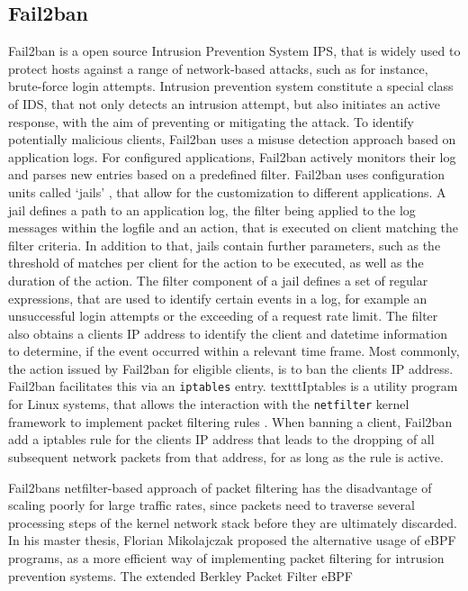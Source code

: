 \subsection{Fail2ban} \label{sec:fail2ban}

Fail2ban is a open source Intrusion Prevention System \ac{IPS}, that is widely used to protect hosts against a range of network-based attacks, such as for instance, brute-force login attempts\cite{fail2ban}. Intrusion prevention system constitute
a special class of \ac{IDS}, that not only detects an intrusion attempt, but also initiates an active response, with the aim of preventing or mitigating the attack. To identify potentially malicious clients,
Fail2ban uses a misuse detection approach based on application logs. For configured applications, Fail2ban actively monitors their log and parses new entries based on a predefined filter. Fail2ban uses configuration units called `jails'  
, that allow for the customization to different applications. A jail defines a path to an application log, the filter being applied to the log messages within the logfile and an action, that
is executed on client matching the filter criteria. In addition to that, jails contain further parameters, such as the threshold of matches per client for the action to be executed,
as well as the duration of the action. The filter component of a jail defines a set of regular expressions, that are used to identify certain events in a log, for example an unsuccessful login attempts or the 
exceeding of a request rate limit. The filter also obtains a clients IP address to identify the client and datetime information to determine, if the event occurred within a relevant time frame. 
Most commonly, the action issued by Fail2ban for eligible clients, is to ban the clients IP address. Fail2ban facilitates this via an \texttt{iptables} entry. 
texttt{Iptables} is a utility program for Linux systems, that allows the interaction with the \texttt{netfilter} kernel framework to implement packet filtering rules \cite{netfiler,iptables}. When banning a client, Fail2ban add a iptables rule for the clients IP address that leads 
to the dropping of all subsequent network packets from that address, for as long as the rule is active.
\par
Fail2bans netfilter-based approach of packet filtering has the disadvantage of scaling poorly for large traffic rates, since packets need to traverse several processing steps of the kernel network stack before they are ultimately discarded.
In his master thesis, Florian Mikolajczak proposed the alternative usage of eBPF programs, as a more efficient way of implementing packet filtering for intrusion prevention systems\cite{mikolajczak2022}. The extended Berkley Packet Filter \ac{eBPF}      
